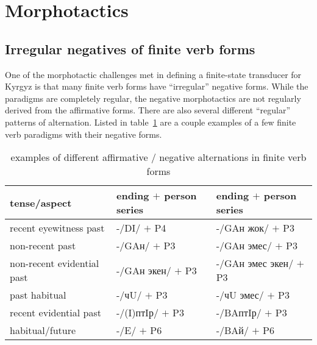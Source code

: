 \documentclass[a4paper,12pt,onecolumn,oneside]{article}
\begin{document}

\section{Morphotactics}


\subsection{Irregular negatives of finite verb forms}

One of the morphotactic challenges met in defining a finite-state transducer for Kyrgyz is that many finite verb forms have ``irregular'' negative forms.  While the paradigms are completely regular, the negative morphotactics are not regularly derived from the affirmative forms.  There are also several different ``regular'' patterns of alternation.  Listed in table~\ref{irregnegs} are a couple examples of a few finite verb paradigms with their negative forms.

\begin{table}[htbp]
	\caption{examples of different affirmative / negative alternations in finite verb forms}\label{irregnegs}
	\centering
	\begin{tabular}{lll}
		\toprule
		tense/aspect & ending $+$ person series & ending $+$ person series \\
		\midrule
		recent eyewitness past & -/DI/ $+$ P4\footnotemark{} & -/GAн жок/ $+$ P3\\
		non-recent past & -/GAн/ $+$ P3 & -/GAн эмес/ $+$ P3\\
		non-recent evidential past & -/GAн экен/ $+$ P3 & -/GAн эмес экен/ $+$ P3\\
		past habitual & -/чU/ $+$ P3 & -/чU эмес/ $+$ P3\\
		recent evidential past & -/(I)птIр/ $+$ P3 & -/BAптIр/ $+$ P3\\
		habitual/future & -/E/ $+$ P6 & -/BAй/ $+$ P6\\
		\bottomrule
	\end{tabular}
\end{table}
\end{document}
